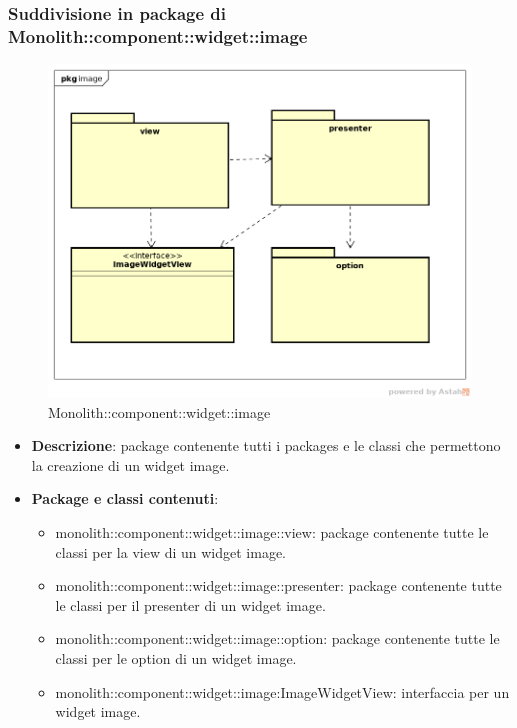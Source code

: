 \subsubsection{Suddivisione in package  di Monolith::component::widget::image}
\label{Monolith::component::widget::image}
\begin{figure}[H]
	\centering
	\includegraphics[scale=0.5]{Sezioni/imgPackage/component_widget_image.png}
	\caption{Monolith::component::widget::image}
\end{figure}
\begin{itemize}
	\item{\textbf{Descrizione}}: package contenente tutti i packages e le classi che permettono la creazione di un widget image.
	\item{\textbf{Package e classi contenuti}}:
	\begin{itemize}
	\item{monolith::component::widget::image::view}: package contenente tutte le classi per la view di un widget image.
	\item{monolith::component::widget::image::presenter}: package contenente tutte le classi per il presenter di un widget image.
	\item{monolith::component::widget::image::option}: package contenente tutte le classi per le option di un widget image.
	\item{monolith::component::widget::image:ImageWidgetView}: interfaccia per un widget image.
	\end{itemize}

\end{itemize}


